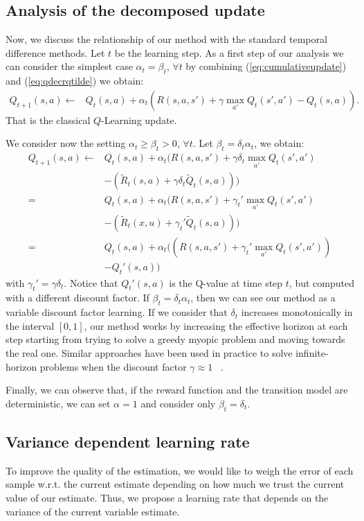 \subsection{Analysis of the decomposed update}
Now, we discuss the relationship of our method with the standard temporal difference methods. Let $t$ be the learning step. As a first step of our analysis we can consider the simplest case $\alpha_t=\beta_t$, $\forall t$ by combining (\ref{eq:cumulativeupdate}) and (\ref{eq:qdecrqtilde}) we obtain:
\begin{align}
Q_{t+1}(s,a) \leftarrow & Q_t(s,a)+\alpha_t(R(s,a,s')+\gamma\max_{a'}Q_t(s',a') - Q_t(s,a)).
\end{align}
That is the classical $Q$-Learning update. 

We consider now the setting $\alpha_t\geq\beta_t>0$, $\forall t$. Let $\beta_t=\delta_t\alpha_t$, we obtain:
\begin{align}
Q_{t+1}(s,a) \leftarrow & Q_t(s,a)+\alpha_t(R(s,a,s')+\gamma\delta_t \max_{a'}Q_t(s',a') \nonumber\\
  & -(\tilde{R}_t(s,a)+\gamma\delta_t\tilde{Q}_t(s,a))) \nonumber\\
= & Q_t(s,a)+\alpha_t(R(s,a,s')+\gamma_t'\max_{a'}Q_t(s',a') \nonumber\\
  & -(\tilde{R}_t(x,u)+\gamma_t'\tilde{Q}_t(s,a))) \nonumber\\
= & Q_t(s,a)+\alpha_t((R(s,a,s')+\gamma_t'\max_{a'}Q_t(s',a')) \nonumber\\
  & - Q_t'(s,a))
\end{align}
with $\gamma_t'=\gamma\delta_t$. Notice that $Q_t'(s,a)$ is the Q-value at time step $t$, but computed with a different discount factor. If $\beta_t=\delta_t\alpha_t$, then we can see our method as a variable discount factor learning. If we consider that $\delta_t$ increases monotonically in the interval $[0,1]$, our method works by increasing the effective horizon at each step starting from trying to solve a greedy myopic problem and moving towards the real one.
Similar approaches have been used in practice to solve infinite-horizon problems when the discount factor $\gamma \approx 1$ ~\cite{crites1996improving, bao2008infinite, franccois2015discount}.

Finally, we can observe that, if the reward function and the transition model are deterministic, we can set $\alpha=1$ and consider only $\beta_t=\delta_t$.

\subsection{Variance dependent learning rate}
To improve the quality of the estimation, we would like to weigh the error of each sample w.r.t. the current estimate depending on how much we trust the current value of our estimate. Thus, we propose a learning rate that depends on the variance of the current variable estimate.

